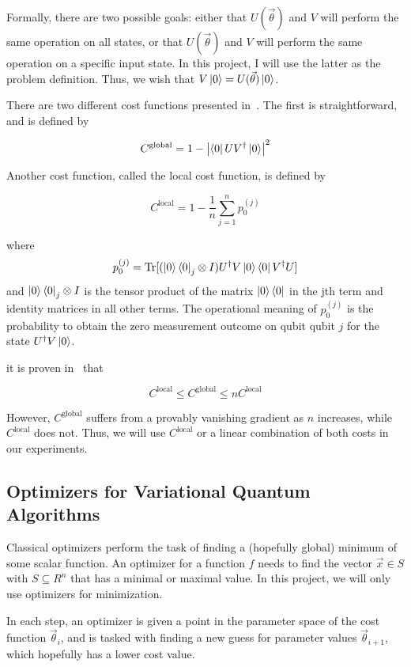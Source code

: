\documentclass[a4paper,12pt]{article}
\newcommand{\thetas}{\vec{\theta}}
\DeclareMathOperator{\tr}{Tr}
\begin{document}
Formally, there are two possible goals: either that $U(\thetas)$ and $V$ will perform the same operation on all states, or that $U(\thetas)$ and $V$ will perform the same operation on a specific input state.
In this project, I will use the latter as the problem definition. Thus, we wish that $V\ket{0} = U(\thetas)\ket{0}$.

There are two different cost functions presented in~\cite{khatri_quantum-assisted_2019}.
The first is straightforward, and is defined by

$$ C^{\textrm{global}} = 1 - \left|\bra{0}UV^\dagger\ket{0}\right|^2 $$

Another cost function, called the local cost function, is defined by 

$$ C^{\textrm{local}} = 1 - \frac{1}{n} \sum_{j=1}^{n} p_0^{(j)} $$

where
$$ p_0^{(j)} = \tr[({\ket{0}\bra{0}}_j \otimes I) U^\dagger V \ket{0}\bra{0} V^\dagger U] $$
and ${\ket{0}\bra{0}}_j \otimes I$ is the tensor product of the matrix $\ket{0}\bra{0}$ in the jth term and identity matrices in all other terms.
The operational meaning of $p_0^{(j)}$ is the probability to obtain the zero measurement outcome on qubit qubit $j$ for the state $U^\dagger V\ket{0}$.

it is proven in~\cite{sharma_noise_2020} that

$$ C^{\textrm{local}} \leq C^{\textrm{global}} \leq nC^{\textrm{local}} $$

However, $C^\textrm{global}$ suffers from a provably vanishing gradient as $n$ increases, while $C^\textrm{local}$ does not. Thus, we will use $C^\textrm{local}$ or a linear combination of both costs in our experiments.

\subsection{Optimizers for Variational Quantum Algorithms} \label{subsec:optimizers}
Classical optimizers perform the task of finding a (hopefully global) minimum of some scalar function.
An optimizer for a function $f$ needs to find the vector $\vec{x} \in S$ with $S \subseteq R^n$ that has a minimal or maximal value. In this project, we will only use optimizers for minimization.

In each step, an optimizer is given a point in the parameter space of the cost function $\thetas_{i}$, and is tasked with finding a new guess for parameter values $\thetas_{i+1}$, which hopefully has a lower cost value.
\end{document}
